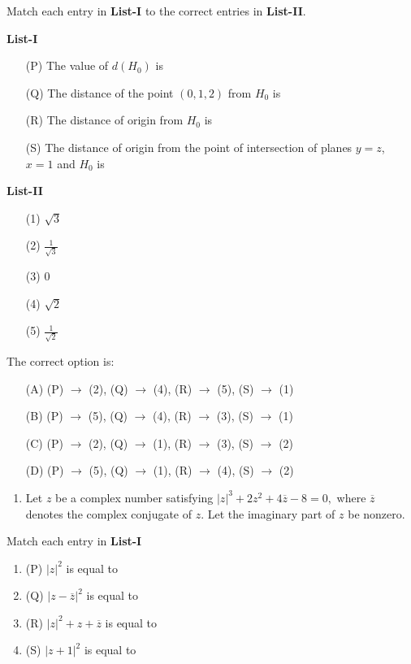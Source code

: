 \documentclass[12pt,a4paper]{article}
\begin{document}
Match each entry in \textbf{List-I} to the correct entries in \textbf{List-II}.

\textbf{List-I}
\begin{enumerate}
    \item[(P)] The value of $d(H_0)$ is
    \item[(Q)] The distance of the point $(0,1,2)$ from $H_0$ is
    \item[(R)] The distance of origin from $H_0$ is
    \item[(S)] The distance of origin from the point of intersection of planes $y=z$, $x=1$ and $H_0$ is
\end{enumerate}

\textbf{List-II}
\begin{enumerate}
    \item[(1)] $\sqrt{3}$
    \item[(2)] $\frac{1}{\sqrt{3}}$
    \item[(3)] $0$
    \item[(4)] $\sqrt{2}$
    \item[(5)] $\frac{1}{\sqrt{2}}$
\end{enumerate}


The correct option is:
\begin{enumerate}
    \item[(A)] (P) $\rightarrow$ (2), (Q) $\rightarrow$ (4), (R) $\rightarrow$ (5), (S) $\rightarrow$ (1)
    \item[(B)] (P) $\rightarrow$ (5), (Q) $\rightarrow$ (4), (R) $\rightarrow$ (3), (S) $\rightarrow$ (1)
    \item[(C)] (P) $\rightarrow$ (2), (Q) $\rightarrow$ (1), (R) $\rightarrow$ (3), (S) $\rightarrow$ (2)
    \item[(D)] (P) $\rightarrow$ (5), (Q) $\rightarrow$ (1), (R) $\rightarrow$ (4), (S) $\rightarrow$ (2)
\end{enumerate} 

\begin{enumerate}
\item Let $z$ be a complex number satisfying  
$
|z|^3 + 2z^2 + 4\overline{z} - 8 = 0,
$
where $\overline{z}$ denotes the complex conjugate of $z$. Let the imaginary part of $z$ be nonzero.
\end{enumerate}

Match each entry in 
\textbf{List-I}
\begin{enumerate}
    \item (P) $|z|^2$ is equal to 
    \item (Q) $|z - \overline{z}|^2$ is equal to  
    \item (R) $|z|^2 + z + \overline{z}$ is equal to 
    \item (S) $|z+1|^2$ is equal to 
\end{enumerate}
\end{document}
